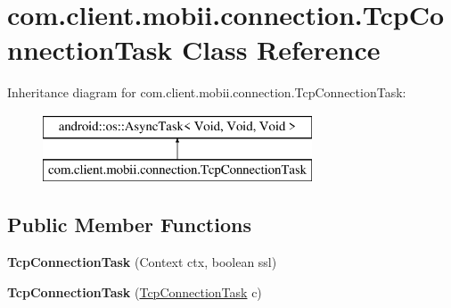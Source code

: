 \hypertarget{classcom_1_1client_1_1mobii_1_1connection_1_1_tcp_connection_task}{\section{com.\-client.\-mobii.\-connection.\-Tcp\-Connection\-Task Class Reference}
\label{classcom_1_1client_1_1mobii_1_1connection_1_1_tcp_connection_task}
}
Inheritance diagram for com.\-client.\-mobii.\-connection.\-Tcp\-Connection\-Task\-:\begin{figure}[H]
\begin{center}
\leavevmode
\includegraphics[height=2.000000cm]{classcom_1_1client_1_1mobii_1_1connection_1_1_tcp_connection_task}
\end{center}
\end{figure}
\subsection*{Public Member Functions}
\begin{DoxyCompactItemize}
\item 
\hypertarget{classcom_1_1client_1_1mobii_1_1connection_1_1_tcp_connection_task_a79de24cde0dd69a18ae8ad35896596b5}{{\bfseries Tcp\-Connection\-Task} (Context ctx, boolean ssl)}\label{classcom_1_1client_1_1mobii_1_1connection_1_1_tcp_connection_task_a79de24cde0dd69a18ae8ad35896596b5}

\item 
\hypertarget{classcom_1_1client_1_1mobii_1_1connection_1_1_tcp_connection_task_ab1f4f9249d5daf4ed0cb505827e42038}{{\bfseries Tcp\-Connection\-Task} (\hyperlink{classcom_1_1client_1_1mobii_1_1connection_1_1_tcp_connection_task}{Tcp\-Connection\-Task} c)}\label{classcom_1_1client_1_1mobii_1_1connection_1_1_tcp_connection_task_ab1f4f9249d5daf4ed0cb505827e42038}

\end{DoxyCompactItemize}
